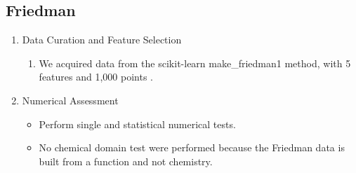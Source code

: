 \subsection{Friedman}
\begin{enumerate}
    \item Data Curation and Feature Selection

    \begin{enumerate}
        \item We acquired data from the scikit-learn make\_friedman1 method, with 5 features and 1,000 points \cite{scikit-learn}.
    \end{enumerate}

    \item Numerical Assessment

    \begin{itemize}
        \item Perform single and statistical numerical tests.
        \item No chemical domain test were performed because the Friedman data is built from a function and not chemistry.
    \end{itemize}
\end{enumerate}
